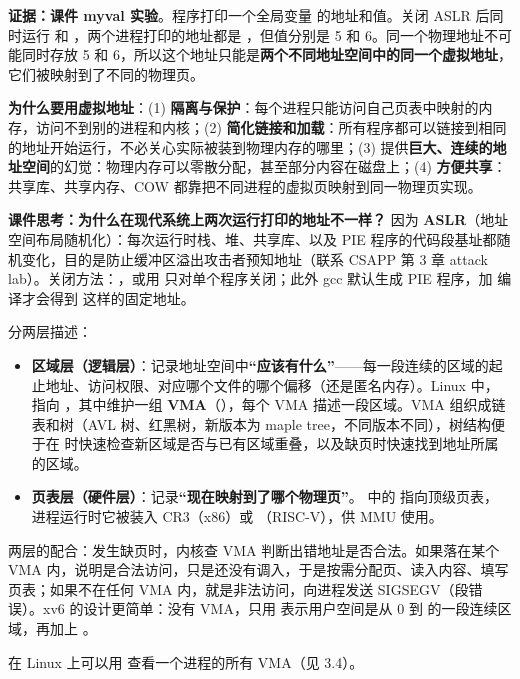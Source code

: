 \textbf{证据：课件 myval 实验}。程序打印一个全局变量  的地址和值。关闭 ASLR 后同时运行  和 ，两个进程打印的地址都是 ，但值分别是 5 和 6。同一个物理地址不可能同时存放 5 和 6，所以这个地址只能是\textbf{两个不同地址空间中的同一个虚拟地址}，它们被映射到了不同的物理页。

\textbf{为什么要用虚拟地址}：(1) \textbf{隔离与保护}：每个进程只能访问自己页表中映射的内存，访问不到别的进程和内核；(2) \textbf{简化链接和加载}：所有程序都可以链接到相同的地址开始运行，不必关心实际被装到物理内存的哪里；(3) 提供\textbf{巨大、连续的地址空间}的幻觉：物理内存可以零散分配，甚至部分内容在磁盘上；(4) \textbf{方便共享}：共享库、共享内存、COW 都靠把不同进程的虚拟页映射到同一物理页实现。

\textbf{课件思考：为什么在现代系统上两次运行打印的地址不一样？} 因为 \textbf{ASLR}（地址空间布局随机化）：每次运行时栈、堆、共享库、以及 PIE 程序的代码段基址都随机变化，目的是防止缓冲区溢出攻击者预知地址（联系 CSAPP 第 3 章 attack lab）。关闭方法：，或用  只对单个程序关闭；此外 gcc 默认生成 PIE 程序，加  编译才会得到  这样的固定地址。

分两层描述：
\begin{itemize}
    \item \textbf{区域层（逻辑层）}：记录地址空间中\textbf{“应该有什么”}——每一段连续的区域的起止地址、访问权限、对应哪个文件的哪个偏移（还是匿名内存）。Linux 中， 指向 ，其中维护一组 \textbf{VMA}（），每个 VMA 描述一段区域。VMA 组织成链表和树（AVL 树、红黑树，新版本为 maple tree，不同版本不同），树结构便于在  时快速检查新区域是否与已有区域重叠，以及缺页时快速找到地址所属的区域。
    \item \textbf{页表层（硬件层）}：记录\textbf{“现在映射到了哪个物理页”}。 中的  指向顶级页表，进程运行时它被装入 CR3（x86）或 （RISC-V），供 MMU 使用。
\end{itemize}
两层的配合：发生缺页时，内核查 VMA 判断出错地址是否合法。如果落在某个 VMA 内，说明是合法访问，只是还没有调入，于是按需分配页、读入内容、填写页表；如果不在任何 VMA 内，就是非法访问，向进程发送 SIGSEGV（段错误）。xv6 的设计更简单：没有 VMA，只用  表示用户空间是从 0 到  的一段连续区域，再加上 。

在 Linux 上可以用  查看一个进程的所有 VMA（见 3.4）。

